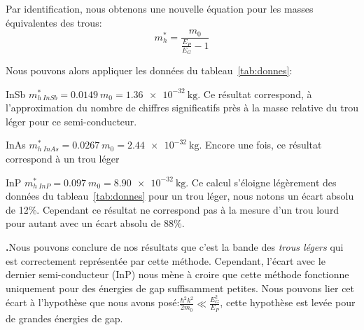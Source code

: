 \documentclass[a4paper,12pt]{article}
\newcounter{numQuestion}
\newcounter{numSubQuestion}
\newcommand{\Question}{%
  \stepcounter{numQuestion}%
  \setcounter{numSubQuestion}{0}%
 \par\noindent \textbf{\arabic{numQuestion}.\hspace{2pt}}}
\begin{document}
Par identification, nous obtenons une nouvelle équation pour les masses équivalentes des trous:
\begin{equation}\label{equ:met}
  m_h^* = \frac{m_0}{\frac{E_P}{E_G} -1}
\end{equation}

Nous pouvons alors appliquer les données du tableau~\ref{tab:donnes}:
\begin{description}
\item{InSb} $m_{h\ InSb}^* = \num{0,0149}\ m_0 = \SI{1,36e-32}{\kilogram}$. Ce résultat correspond, à l'approximation du nombre de chiffres significatifs près à la masse relative du trou léger pour ce semi-conducteur. 
\item{InAs} $m_{h\ InAs}^* = \num{0,0267}\ m_0 = \SI{2,44e-32}{\kilogram}$. Encore une fois, ce résultat correspond à un trou léger
\item{InP} $m_{h\ InP}^* = \num{0,097}\ m_0 = \SI{8,90e-32}{\kilogram}$. Ce calcul s'éloigne légèrement des données du tableau~\ref{tab:donnes} pour un trou léger, nous notons un écart absolu de 12\%. Cependant ce résultat ne correspond pas à la mesure d'un trou lourd pour autant avec un écart absolu de 88\%.
\end{description}

\Question Nous pouvons conclure de nos résultats que c'est la bande des \emph{trous légers} qui est correctement représentée par cette méthode. Cependant, l'écart avec le dernier semi-conducteur (InP) nous mène à croire que cette méthode fonctionne uniquement pour des énergies de gap suffisamment petites. Nous pouvons lier cet écart à l'hypothèse que nous avons posé:$\frac{\hbar^2k^2}{2m_0} \ll \frac{E_G^2}{E_P}$, cette hypothèse est levée pour de grandes énergies de gap.  
  
\end{document}
